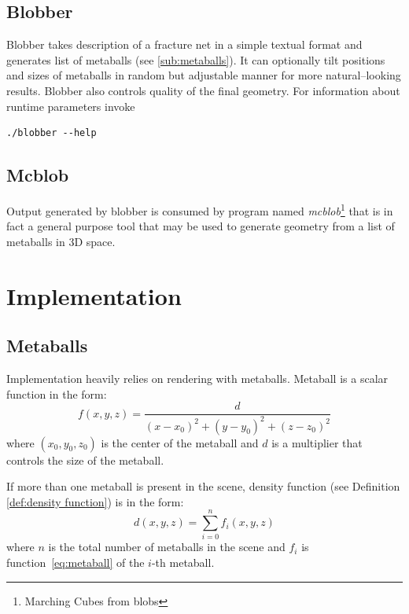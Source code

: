 \subsection{Blobber}
Blobber takes description of a fracture net in a simple textual format and
generates list of metaballs (see \autoref{sub:metaballs}). It can
optionally tilt positions and sizes of metaballs in random but adjustable manner
for more natural--looking results. Blobber also controls quality of the final
geometry. For information about runtime parameters invoke
\begin{verbatim}
./blobber --help
\end{verbatim}

\subsection{Mcblob}
Output generated by blobber is consumed by program named \emph{mcblob}\footnote{Marching
Cubes from blobs} that is in fact a general purpose tool that may be used to
generate geometry from a list of metaballs in 3D space.

\section{Implementation}
\subsection{Metaballs}
Implementation heavily relies on rendering with metaballs. Metaball is a scalar
function in the form:
\begin{equation}
  f(x,y,z)=\frac{d}{(x-x_0)^2+(y-y_0)^2+(z-z_0)^2}
  \label{eq:metaball}
\end{equation}
where $(x_0,y_0,z_0)$ is the center of the metaball and $d$ is a multiplier that
controls the size of the metaball.

If more than one metaball is present in the scene, density function (see Definition
\autoref{def:density function})
is in the form:
\begin{equation}
  d(x,y,z) = \sum_{i=0}^{n} f_i(x,y,z)
  \label{eq:metaballdensity}
\end{equation}
where $n$ is the total number of metaballs in the scene and $f_i$ is function~\ref{eq:metaball}
of the $i$-th metaball.

